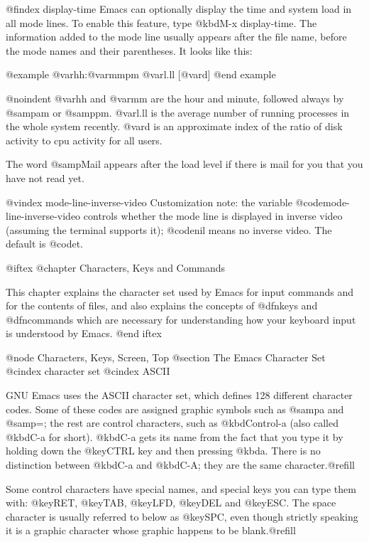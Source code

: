 {{@findex display-time
  Emacs can optionally display the time and system load in all mode lines.
To enable this feature, type @kbd{M-x display-time}.  The information added
to the mode line usually appears after the file name, before the mode names
and their parentheses.  It looks like this:

@example
@var{hh}:@var{mm}pm @var{l.ll} [@var{d}]
@end example

@noindent
@var{hh} and @var{mm} are the hour and minute, followed always by @samp{am}
or @samp{pm}.  @var{l.ll} is the average number of running processes in the
whole system recently.  @var{d} is an approximate index of the ratio of
disk activity to cpu activity for all users.

The word @samp{Mail} appears after the load level if there is mail for
you that you have not read yet.

@vindex mode-line-inverse-video
  Customization note: the variable @code{mode-line-inverse-video} controls
whether the mode line is displayed in inverse video (assuming the terminal
supports it); @code{nil} means no inverse video.  The default is @code{t}.

@iftex
@chapter Characters, Keys and Commands

  This chapter explains the character set used by Emacs for input commands
and for the contents of files, and also explains the concepts of
@dfn{keys} and @dfn{commands} which are necessary for understanding how
your keyboard input is understood by Emacs.
@end iftex

@node Characters, Keys, Screen, Top
@section The Emacs Character Set
@cindex character set
@cindex ASCII

  GNU Emacs uses the ASCII character set, which defines 128 different
character codes.  Some of these codes are assigned graphic symbols such
as @samp{a} and @samp{=}; the rest are control characters, such as
@kbd{Control-a} (also called @kbd{C-a} for short).  @kbd{C-a} gets its name
from the fact that you type it by holding down the @key{CTRL} key and
then pressing @kbd{a}.  There is no distinction between @kbd{C-a} and
@kbd{C-A}; they are the same character.@refill

  Some control characters have special names, and special keys you can
type them with: @key{RET}, @key{TAB}, @key{LFD}, @key{DEL} and @key{ESC}.
The space character is usually referred to below as @key{SPC}, even though
strictly speaking it is a graphic character whose graphic happens to be
blank.@refill

}}

